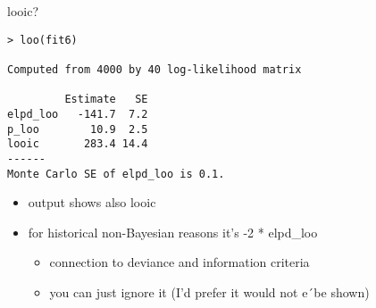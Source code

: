 \documentclass[english,t]{beamer}
\begin{document}



  

\begin{frame}[fragile]{looic?}

\begin{verbatim}
> loo(fit6)

Computed from 4000 by 40 log-likelihood matrix

         Estimate   SE
elpd_loo   -141.7  7.2
p_loo        10.9  2.5
looic       283.4 14.4
------
Monte Carlo SE of elpd_loo is 0.1.
\end{verbatim}

  \begin{itemize}
  \item {} output shows also {looic}
  \item for historical non-Bayesian reasons it's -2 * elpd\_loo
    \begin{itemize}
      \item connection to deviance and information criteria
      \item you can just ignore it (I'd prefer it would not e´be shown)
    \end{itemize}

  \end{itemize}
  
\end{frame}
\end{document}
